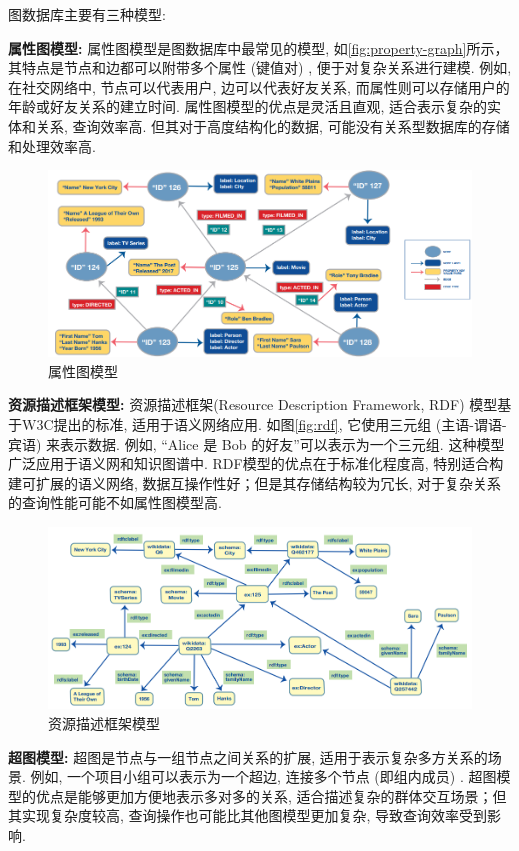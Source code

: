 \documentclass[12pt,hyperref,a4paper,UTF8]{ctexart}
\begin{document}
图数据库主要有三种模型:

\textbf{属性图模型:} 属性图模型是图数据库中最常见的模型, 如\autoref{fig:property-graph}所示，其特点是节点和边都可以附带多个属性 (键值对) , 便于对复杂关系进行建模. 例如, 在社交网络中, 节点可以代表用户, 边可以代表好友关系, 而属性则可以存储用户的年龄或好友关系的建立时间. 属性图模型的优点是灵活且直观, 适合表示复杂的实体和关系, 查询效率高. 但其对于高度结构化的数据, 可能没有关系型数据库的存储和处理效率高.
\begin{figure}
	\centering
	\includegraphics[width=\textwidth]{images/9.png}
	\caption{属性图模型}
	\label{fig:property-graph}
\end{figure}

\textbf{资源描述框架模型:} 资源描述框架(Resource Description Framework, RDF) 模型基于W3C提出的标准, 适用于语义网络应用. 如图\autoref{fig:rdf}, 它使用三元组 (主语-谓语-宾语) 来表示数据. 例如, “Alice 是 Bob 的好友”可以表示为一个三元组. 这种模型广泛应用于语义网和知识图谱中. RDF模型的优点在于标准化程度高, 特别适合构建可扩展的语义网络, 数据互操作性好；但是其存储结构较为冗长, 对于复杂关系的查询性能可能不如属性图模型高.
\begin{figure}[H]
	\centering
	\includegraphics[width=\textwidth]{images/10.png}
	\caption{资源描述框架模型}
	\label{fig:rdf}
\end{figure}

\textbf{超图模型:} 超图是节点与一组节点之间关系的扩展, 适用于表示复杂多方关系的场景. 例如, 一个项目小组可以表示为一个超边, 连接多个节点 (即组内成员) . 超图模型的优点是能够更加方便地表示多对多的关系, 适合描述复杂的群体交互场景；但其实现复杂度较高, 查询操作也可能比其他图模型更加复杂, 导致查询效率受到影响.
\end{document}
